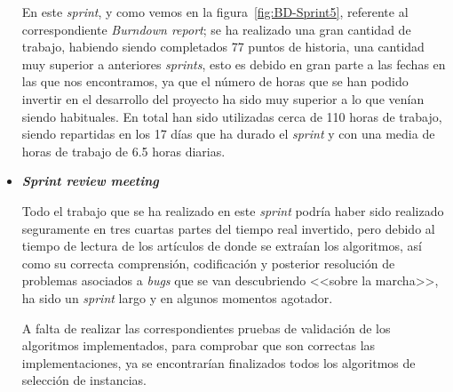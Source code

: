 \begin{itemize}
En este \textit{sprint}, y como vemos en la figura~\ref{fig:BD-Sprint5}, referente al correspondiente \textit{Burndown report}; se ha realizado una gran cantidad de trabajo, habiendo siendo completados 77 puntos de historia, una cantidad muy superior a anteriores \textit{sprints}, esto es debido en gran parte a las fechas en las que nos encontramos, ya que el número de horas que se han podido invertir en el desarrollo del proyecto ha sido muy superior a lo que venían siendo habituales. En total han sido utilizadas cerca de 110 horas de trabajo, siendo repartidas en los 17 días que ha durado el \textit{sprint} y con una media de horas de trabajo de 6.5 horas diarias. 
\item \textbf{\textit{Sprint review meeting}}

Todo el trabajo que se ha realizado en este \textit{sprint} podría haber sido realizado seguramente en tres cuartas partes del tiempo real invertido, pero debido al tiempo de lectura de los artículos de donde se extraían los algoritmos, así como su correcta comprensión, codificación y posterior resolución de problemas asociados a \textit{bugs} que se van descubriendo <<sobre la marcha>>, ha sido un \textit{sprint} largo y en algunos momentos agotador. 

A falta de realizar las correspondientes pruebas de validación de los algoritmos implementados, para comprobar que son correctas las implementaciones, ya se encontrarían finalizados todos los algoritmos de selección de instancias.

\end{itemize}
